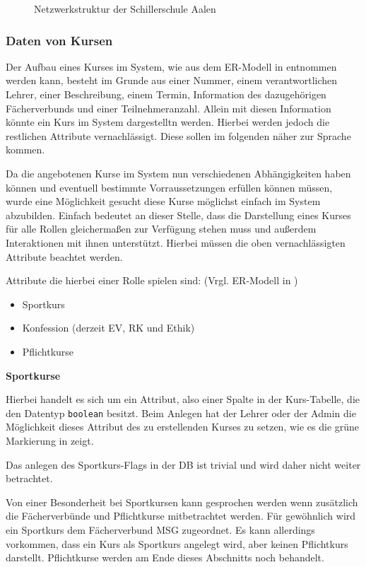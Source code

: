 \begin{figure}[H]
\begin{tikzpicture}[x=\daywidth, y=-1cm, node distance=0 cm,outer sep = 0pt]
\end{tikzpicture}
\caption[\textbf{Netzwerkstruktur der Schillerschule Aalen}]{Netzwerkstruktur der Schillerschule Aalen}
\label{fig:Stundenplan}
\end{figure}

\subsubsection{Daten von Kursen}

Der Aufbau eines Kurses im System, wie aus dem ER-Modell in  entnommen werden kann, besteht im Grunde aus einer Nummer, einem verantwortlichen Lehrer, einer Beschreibung, einem Termin, Information des dazugehörigen Fächerverbunds  und einer Teilnehmeranzahl. Allein mit diesen Information könnte ein Kurs im System dargestelltn werden. Hierbei werden jedoch die restlichen Attribute vernachlässigt. Diese sollen im folgenden näher zur Sprache kommen.  

Da die angebotenen Kurse im System nun verschiedenen Abhängigkeiten haben können und eventuell bestimmte Vorraussetzungen erfüllen können müssen, wurde eine Möglichkeit gesucht diese Kurse möglichst einfach im System abzubilden. 
Einfach bedeutet an dieser Stelle, dass die Darstellung eines Kurses für alle Rollen gleichermaßen zur Verfügung stehen muss und außerdem Interaktionen mit ihnen unterstützt.
Hierbei müssen die oben vernachlässigten Attribute beachtet werden. 

Attribute die hierbei einer Rolle spielen sind: (Vrgl. ER-Modell in )
\begin{itemize}
  \item Sportkurs
  \item Konfession (derzeit EV, RK und Ethik)
  \item Pflichtkurse
\end{itemize}

\textbf{Sportkurse}

Hierbei handelt es sich um ein Attribut, also einer Spalte in der Kurs-Tabelle, die den Datentyp \texttt{boolean} besitzt.
Beim Anlegen hat der Lehrer oder der Admin die Möglichkeit dieses Attribut des zu erstellenden Kurses zu setzen, wie es die grüne Markierung in  zeigt.

Das anlegen des Sportkurs-Flags in der DB ist trivial und wird daher nicht weiter betrachtet.

Von einer Besonderheit bei Sportkursen kann gesprochen werden wenn zusätzlich die Fächerverbünde und Pflichtkurse mitbetrachtet werden.
Für gewöhnlich wird ein Sportkurs dem Fächerverbund \ac{MSG} zugeordnet. Es kann allerdings vorkommen, dass ein Kurs als Sportkurs angelegt wird, aber keinen Pflichtkurs darstellt.  
Pflichtkurse werden am Ende dieses Abschnitts noch behandelt.

